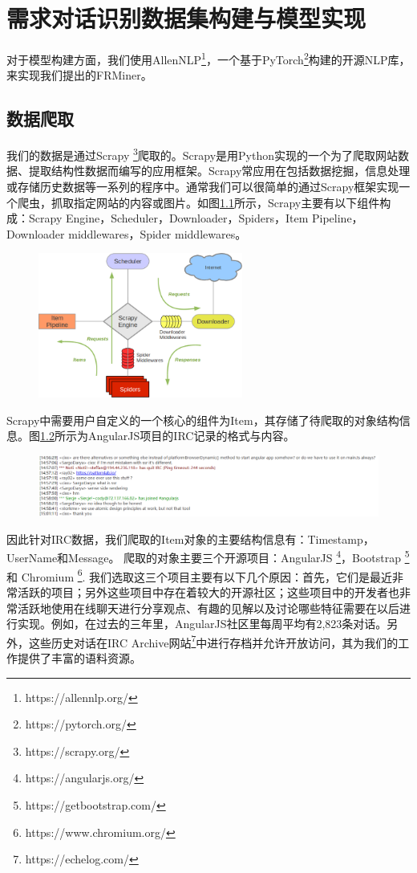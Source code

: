 \chapter{需求对话识别数据集构建与模型实现}

对于模型构建方面，我们使用AllenNLP\footnote{https://allennlp.org/}，一个基于PyTorch\footnote{https://pytorch.org/}构建的开源NLP库，来实现我们提出的FRMiner。
\section{数据爬取}
我们的数据是通过Scrapy \footnote{https://scrapy.org/}爬取的。Scrapy是用Python实现的一个为了爬取网站数据、提取结构性数据而编写的应用框架。Scrapy常应用在包括数据挖掘，信息处理或存储历史数据等一系列的程序中。通常我们可以很简单的通过Scrapy框架实现一个爬虫，抓取指定网站的内容或图片。如图\ref{fig:scrapy}所示，Scrapy主要有以下组件构成：Scrapy Engine，Scheduler，Downloader，Spiders，Item Pipeline，Downloader middlewares，Spider middlewares。
\begin{figure}[htbp]
    \centering
    \includegraphics[width=0.6\textwidth]{Img/scrapy.png}
    \label{fig:scrapy}
\end{figure}
Scrapy中需要用户自定义的一个核心的组件为Item，其存储了待爬取的对象结构信息。图\ref{fig:echelog}所示为AngularJS项目的IRC记录的格式与内容。
\begin{figure}[htbp]
    \centering
    \includegraphics[width=\textwidth]{Img/echelog.png}
    \label{fig:echelog}
\end{figure}
因此针对IRC数据，我们爬取的Item对象的主要结构信息有：Timestamp，UserName和Message。
爬取的对象主要三个开源项目：AngularJS \footnote{https://angularjs.org/}，Bootstrap  \footnote{https://getbootstrap.com/}和 Chromium \footnote{https://www.chromium.org/}. 我们选取这三个项目主要有以下几个原因：首先，它们是最近非常活跃的项目；另外这些项目中存在着较大的开源社区；这些项目中的开发者也非常活跃地使用在线聊天进行分享观点、有趣的见解以及讨论哪些特征需要在以后进行实现。例如，在过去的三年里，AngularJS社区里每周平均有2,823条对话。另外，这些历史对话在IRC Archive网站\footnote{https://echelog.com/}中进行存档并允许开放访问，其为我们的工作提供了丰富的语料资源。

